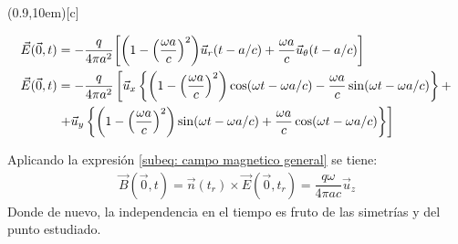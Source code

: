 \documentclass[11 pt]{article}
\begin{document}
\begin{center}
    \framebox(0.9\textwidth,10em)[c]{\begin{minipage}{0.8\textwidth}
            \begin{align}
            \vec{E}(\vec{0}, t) &= -\dfrac{q}{4\pi a^2}\qty[\qty(1-\qty(\dfrac{\omega a}{c})^2)\vec{u}_r (t-a/c)+ \dfrac{\omega a}{c}\vec{u}_\theta (t-a/c)]  \\
            \vec{E}(\vec{0}, t)&= -\dfrac{q}{4\pi a^2}\left[\vec{u}_x\left\{\qty(1-\qty(\dfrac{\omega a}{c})^2)\cos(\omega t - \omega a/c) - \dfrac{\omega a}{c}\sin(\omega t - \omega a/c)\right\} + \nonumber\right.\\
            &\left.+\vec{u}_y\left\{\qty(1-\qty(\dfrac{\omega a}{c})^2)\sin(\omega t - \omega a/c) + \dfrac{\omega a}{c}\cos(\omega t - \omega a/c)\right\} \right]
        \end{align}    
    \end{minipage}}
\end{center}

    
Aplicando la expresión \eqref{subeq: campo magnetico general} se tiene: 
\begin{align}
    \boxed{\vec{B}(\vec{0}, t) = \vec{n}(t_r)\times\vec{E}(\vec{0},t_r) = \dfrac{q\omega}{4\pi ac}\vec{u}_z} 
\end{align}
Donde de nuevo, la independencia en el tiempo es fruto de las simetrías y del punto estudiado. 
\end{document}
